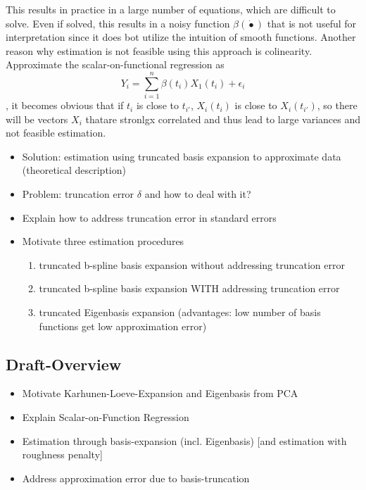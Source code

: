 \documentclass[11pt,twoside,a4paper]{article}
\begin{document}
  This results in practice in a large number of equations, which are difficult to solve. Even if solved, this results in a noisy function $\beta(\dot{•})$ that is not useful for interpretation since it does bot utilize the intuition of smooth functions. Another reason why estimation is not feasible using this approach is colinearity. Approximate the scalar-on-functional regression as
  	\begin{equation}
     Y_i = \sum_{i = 1}^{n} \beta(t_{i})X_1(t_{i}) + \epsilon_{i}
    \end{equation}, it becomes obvious that if $t_{i}$ is close to $t_{i'}$, $X_{i}(t_{i})$ is close to $X_{i}(t_{i'})$, so there will be vectors $X_{i}$ thatare stronlgx correlated and thus lead to large variances and not feasible estimation.
   
    
	
	\begin{itemize}
		\item Solution: estimation using truncated basis expansion to approximate data (theoretical description)
		\item Problem: truncation error $\delta$ and how to deal with it?
		\item Explain how to address truncation error in standard errors
		\item Motivate three estimation procedures
		\begin{enumerate}
			\item truncated b-spline basis expansion without addressing truncation error
			\item truncated b-spline basis expansion WITH addressing truncation error
			\item truncated Eigenbasis expansion (advantages: low number of basis functions get low approximation error)
		\end{enumerate}
	\end{itemize}
	
	\subsection{Draft-Overview}
	\begin{itemize}
		\item Motivate Karhunen-Loeve-Expansion and Eigenbasis from PCA		
		\item Explain Scalar-on-Function Regression
		\item Estimation through basis-expansion (incl. Eigenbasis) [and estimation with roughness penalty]
		\item Address approximation error due to basis-truncation
	\end{itemize}
\end{document}
